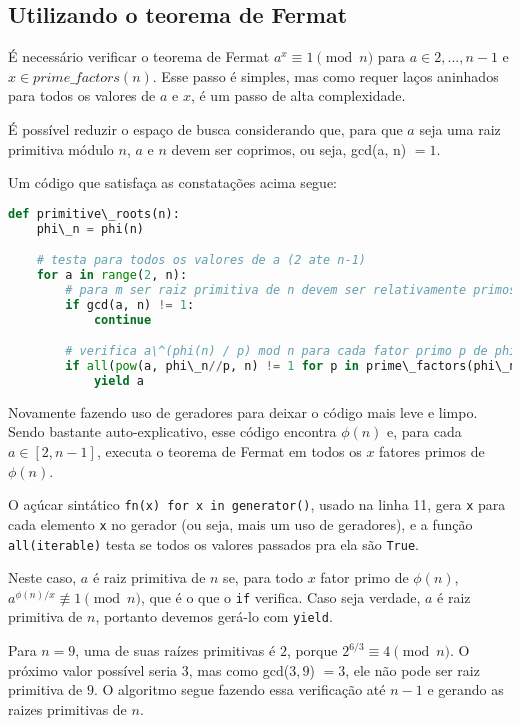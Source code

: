 \documentclass[12pt]{article}
\begin{document}
\subsection{Utilizando o teorema de Fermat}

É necessário verificar o teorema de Fermat $a^{x} \equiv 1 \pmod{n}$ para
$a \in {2, \ldots, n-1}$ e $x \in prime\_factors(n)$. Esse passo é simples,
mas como requer laços aninhados para todos os valores de $a$ e $x$, é um passo
de alta complexidade.

É possível reduzir o espaço de busca considerando que, para que $a$ seja uma
raiz primitiva módulo $n$, $a$ e $n$ devem ser coprimos, ou seja,
gcd(a, n) $= 1$.

Um código que satisfaça as constatações acima segue:

\begin{lstlisting}[language=Python]
def primitive\_roots(n):
    phi\_n = phi(n)

    # testa para todos os valores de a (2 ate n-1)
    for a in range(2, n):
        # para m ser raiz primitiva de n devem ser relativamente primos
        if gcd(a, n) != 1:
            continue

        # verifica a\^(phi(n) / p) mod n para cada fator primo p de phi(n)
        if all(pow(a, phi\_n//p, n) != 1 for p in prime\_factors(phi\_n)):
            yield a
\end{lstlisting}

Novamente fazendo uso de geradores para deixar o código mais leve e limpo.
Sendo bastante auto-explicativo, esse código encontra $\phi(n)$ e, para cada
$a \in [2, n-1]$, executa o teorema de Fermat em todos os $x$ fatores primos de
$\phi(n)$.

O açúcar sintático \texttt{fn(x) for x in generator()}, usado na linha 11,
gera \texttt{x} para cada elemento \texttt{x} no gerador (ou seja, mais um uso
de geradores), e a função \texttt{all(iterable)} testa se todos os valores
passados pra ela são \texttt{True}.

Neste caso, $a$ é raiz primitiva de $n$ se, para todo $x$ fator primo de
$\phi(n)$, $a^{\phi(n)/x} \not\equiv 1 \pmod{n}$, que é o que o \texttt{if}
verifica. Caso seja verdade, $a$ é raiz primitiva de $n$, portanto devemos
gerá-lo com \texttt{yield}.

Para $n = 9$, uma de suas raízes primitivas é $2$, porque
$2^{6/3} \equiv 4 \pmod{n}$. O próximo valor possível seria $3$, mas como
gcd($3, 9$) $= 3$, ele não pode ser raiz primitiva de $9$. O algoritmo segue
fazendo essa verificação até $n-1$ e gerando as raizes primitivas de $n$.
\end{document}
